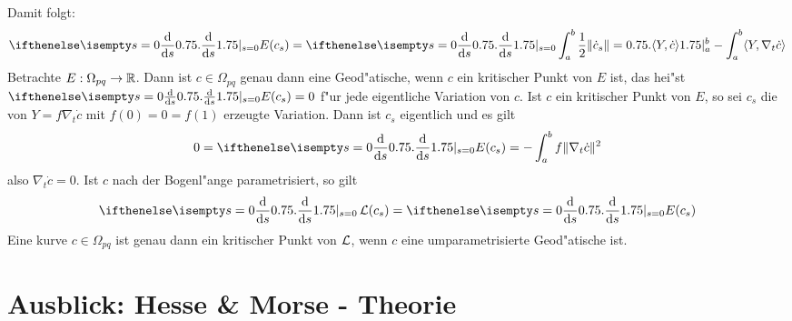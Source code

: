 Damit folgt:
\begin{align*}
	\difffrac[s=0]{}{s} E(c_s) = \difffrac[s=0]{}{s} \int_a^b \frac{1}{2} \|\dot c_s\| = \left. \langle Y, \dot c \rangle \right|_a^b - \int_a^b \langle Y, \nabla_t \dot c \rangle
\end{align*}
Betrachte $E: \Omega_{pq} \to \operatorname{\mathbb{R}}$. Dann ist $c \in \Omega_{pq}$ genau dann eine Geod"atische, wenn $c$ ein kritischer Punkt von $E$ ist, das hei"st $\difffrac[s=0]{}{s}E(c_s) = 0$ f"ur jede eigentliche Variation von $c$.
Ist $c$ ein kritischer Punkt von $E$, so sei $c_s$ die von $Y = f \nabla_t \dot c$ mit $f(0) = 0 = f(1)$ erzeugte Variation.
Dann ist $c_s$ eigentlich und es gilt
\begin{align*}
	0 = \difffrac[s=0]{}{s} E(c_s) = - \int_a^b f \|\nabla_t \dot c\|^2
\end{align*}
also $\nabla_t \dot c = 0$.  Ist $c$ nach der Bogenl"ange parametrisiert, so gilt
\begin{align*}
	\difffrac[s=0]{}{s} \calL(c_s) = \difffrac[s=0]{}{s} E(c_s)
\end{align*}
Eine kurve $c \in \Omega_{pq}$ ist genau dann ein kritischer Punkt von $\operatorname{\mathcal{L}}$, wenn $c$ eine umparametrisierte Geod"atische ist.

\section{Ausblick: Hesse \& Morse - Theorie}

